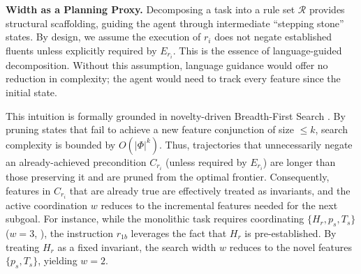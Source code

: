 \documentclass[11pt]{article}
\begin{document}
\noindent \textbf{Width as a Planning Proxy.} Decomposing a task into a rule set $\mathcal{R}$ provides structural scaffolding, guiding the agent through intermediate ``stepping stone'' states. By design, we assume the execution of $r_i$ does not negate established fluents unless explicitly required by $E_{r_i}$. This is the essence of language-guided decomposition. Without this assumption, language guidance would offer no reduction in complexity; the agent would need to track every feature since the initial state.

This intuition is formally grounded in novelty-driven Breadth-First Search \citep{DBLP:conf/aaai/LipovetzkyG17}. By pruning states that fail to achieve a new feature conjunction of size $\le k$, search complexity is bounded by $O(|\Phi|^k)$. Thus, trajectories that unnecessarily negate an already-achieved precondition $C_{r_i}$ (unless required by $E_{r_i}$) are longer than those preserving it and are pruned from the optimal frontier. Consequently, features in $C_{r_i}$ that are already true are effectively treated as invariants, and the active coordination $w$ reduces to the incremental features needed for the next subgoal. For instance, while the monolithic task requires coordinating $\{H_r, p_s, T_s\}$ ($w=3$, ), the instruction $r_{1b}$ leverages the fact that $H_r$ is pre-established. By treating $H_r$ as a fixed invariant, the search width $w$ reduces to the novel features $\{p_s, T_s\}$, yielding $w=2$.





\end{document}
